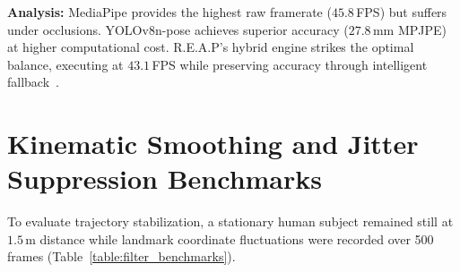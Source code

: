\documentclass[12pt]{report}
\begin{document}
\begin{table}[htbp]
    \centering
    \caption{Pose Estimation Benchmark on Edge Hardware}
    \label{table:pose_benchmarks}
    \footnotesize
\end{table}

\textbf{Analysis:} MediaPipe provides the highest raw framerate ($45.8$\,FPS) but suffers under occlusions. YOLOv8n-pose achieves superior accuracy ($27.8$\,mm MPJPE) at higher computational cost. R.E.A.P's hybrid engine strikes the optimal balance, executing at $43.1$\,FPS while preserving accuracy through intelligent fallback~\cite{bazarevsky2020blazepose, maji2022yolopose}.

\section{Kinematic Smoothing and Jitter Suppression Benchmarks}
To evaluate trajectory stabilization, a stationary human subject remained still at $1.5$\,m distance while landmark coordinate fluctuations were recorded over 500 frames (Table~\ref{table:filter_benchmarks}).

\begin{table}[htbp]
    \centering
    \caption{Filter Performance Comparison}
    \label{table:filter_benchmarks}
    \footnotesize
\end{table}
\end{document}
